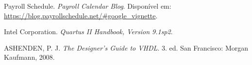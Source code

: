 \begin{thebibliography}{99}

    Payroll Schedule. \textit{Payroll Calendar Blog}. Disponível em: \url{https://blog.payrollschedule.net/#google_vignette}.
    
    Intel Corporation. \textit{Quartus II Handbook, Version 9.1sp2}.
    
    ASHENDEN, P. J. \textit{The Designer's Guide to VHDL}. 3. ed. San Francisco: Morgan Kaufmann, 2008.
    
\end{thebibliography}
    